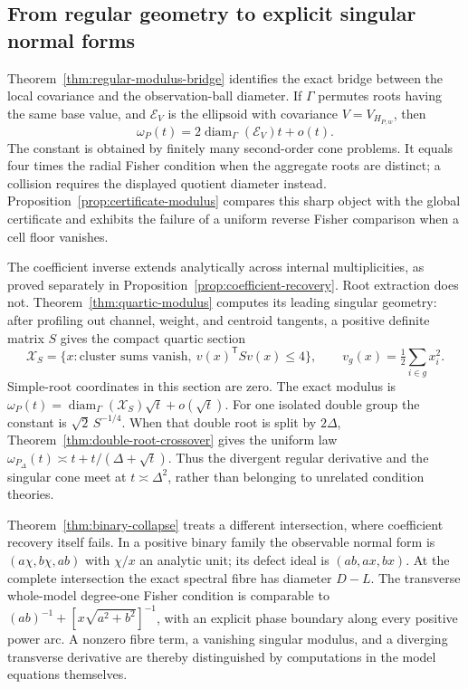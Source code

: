 \documentclass[11pt,reqno]{amsart}
\numberwithin{equation}{section}
\theoremstyle{definition}\newtheorem{definition}[theorem]{Definition}
\theoremstyle{remark}\newtheorem{remark}[theorem]{Remark}
\newcommand{\diam}{\operatorname{diam}}
\begin{document}
\subsection{From regular geometry to explicit singular normal forms}
Theorem~\ref{thm:regular-modulus-bridge} identifies the exact bridge
between the local covariance and the observation-ball diameter.
If $\Gamma$ permutes roots having the same base value, and
$\mathcal E_V$ is the ellipsoid with covariance $V=V_{H_{P,w}}$, then
\[
 \omega_P(t)=2\diam_\Gamma(\mathcal E_V)t+o(t).
\]
The constant is obtained by finitely many second-order cone problems.
It equals four times the radial Fisher condition when the aggregate
roots are distinct; a collision requires the displayed quotient
diameter instead. Proposition~\ref{prop:certificate-modulus} compares
this sharp object with the global certificate and exhibits the
failure of a uniform reverse Fisher comparison when a cell floor
vanishes.

The coefficient inverse extends analytically across internal
multiplicities, as proved separately in
Proposition~\ref{prop:coefficient-recovery}. Root extraction does not.
Theorem~\ref{thm:quartic-modulus} computes its leading singular geometry:
after profiling out channel, weight, and centroid tangents, a positive
definite matrix $S$ gives the compact quartic section
\[
 \mathcal X_S=\{x:\text{cluster sums vanish},\
                  v(x)^{\mathsf T}Sv(x)\le4\},\qquad
 v_g(x)=\tfrac12\sum_{i\in g}x_i^2.
\]
Simple-root coordinates in this section are zero. The exact modulus is
$\omega_P(t)=\diam_\Gamma(\mathcal X_S)\sqrt t+o(\sqrt t)$.
For one isolated double group the constant is $\sqrt2\,S^{-1/4}$.
When that double root is split by $2\Delta$,
Theorem~\ref{thm:double-root-crossover} gives the uniform law
$\omega_{P_\Delta}(t)\asymp t+t/(\Delta+\sqrt t)$.
Thus the divergent regular derivative and the singular cone meet at
$t\asymp\Delta^2$, rather than belonging to unrelated condition theories.

Theorem~\ref{thm:binary-collapse} treats a different intersection, where
coefficient recovery itself fails. In a positive binary family the
observable normal form is $(a\chi,b\chi,ab)$ with $\chi/x$ an analytic
unit; its defect ideal is $(ab,ax,bx)$. At the complete intersection
the exact spectral fibre has diameter $D-L$. The transverse whole-model
degree-one Fisher condition is comparable to
$(ab)^{-1}+[x\sqrt{a^2+b^2}]^{-1}$, with an explicit phase boundary
along every positive power arc. A nonzero fibre term, a vanishing
singular modulus, and a diverging transverse derivative are thereby
distinguished by computations in the model equations themselves.
\end{document}
